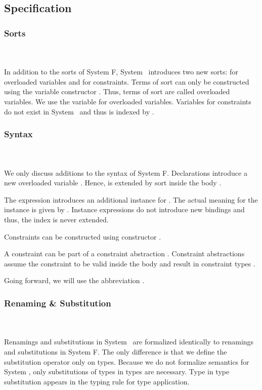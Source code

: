 \subsection{Specification}

\subsubsection{Sorts}\hfill\\\\
In addition to the sorts of System F, System \Fo\ introduces two new sorts:  for overloaded variables and  for constraints.
\FoSort
Terms of sort  can only be constructed using the variable constructor . Thus, terms of sort  are called overloaded variables. We use the variable  for overloaded variables. 
Variables for constraints do not exist in System \Fo\ and thus  is indexed by . 

\subsubsection{Syntax}\hfill\\\\
We only discuss additions to the syntax of System F.
\FoTerm
Declarations   introduce a new overloaded variable . 
Hence,  is extended by sort  inside the body . 

\noindent The expression   \Constr{=}    introduces an additional instance for . 
The actual meaning for the instance is given by .
Instance expressions do not introduce new bindings and thus, the index  is never extended.

\noindent Constraints  can be constructed using constructor  \Constr{:} . 

\noindent A constraint  can be part of a constraint abstraction \Constr{\lambdabar}   . Constraint abstractions assume the constraint  to be valid inside the body  and result in constraint types \Constr{[}  \Constr{]⇒} .

\noindent Going forward, we will use the abbreviation \FoCstr.

\subsubsection{Renaming \& Substitution}\hfill\\\\
Renamings and substitutions in System \Fo\ are formalized identically to renamings and substitutions in System F. 
The only difference is that we define the substitution operator only on types. 
\Fosubs
Because we do not formalize semantics for System \Fo, only substitutions of types in types are necessary. Type in type substitution appears in the typing rule for type application.

